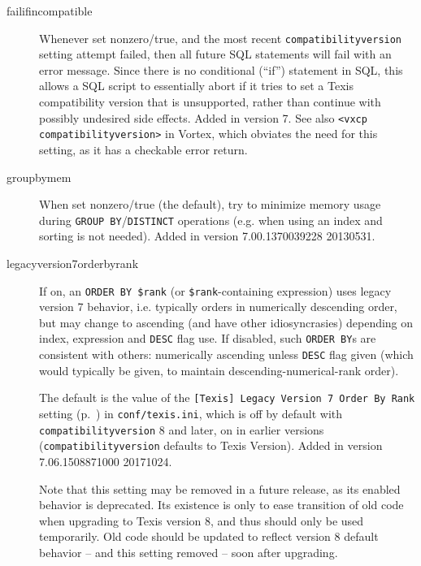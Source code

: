 \begin{description}
\item[failifincompatible]

  Whenever set nonzero/true, and the most recent
  \verb`compatibilityversion` setting attempt failed, then all future
  SQL statements will fail with an error message.  Since there is no
  conditional (``if'') statement in SQL, this allows a SQL script to
  essentially abort if it tries to set a Texis compatibility version
  that is unsupported, rather than continue with possibly undesired
  side effects.  Added in version 7.  See also
  \verb`<vxcp compatibilityversion>` in Vortex, which obviates the
  need for this setting, as it has a checkable error return.

\item[groupbymem]

  When set nonzero/true (the default), try to minimize memory usage
  during \verb`GROUP BY`/\verb`DISTINCT` operations (e.g. when using an
  index and sorting is not needed).  Added in version 7.00.1370039228
  20130531.

\item[legacyversion7orderbyrank]
\label{SqlPropertyLegacyVersion7OrderByRank}

  If on, an {\tt ORDER BY \$rank} (or {\tt \$rank}-containing
  expression) uses legacy version 7 behavior, i.e. typically orders in
  numerically descending order, but may change to ascending (and have
  other idiosyncrasies) depending on index, expression and \verb`DESC`
  flag use.  If disabled, such {\tt ORDER BY}s are consistent with
  others: numerically ascending unless \verb`DESC` flag given (which
  would typically be given, to maintain descending-numerical-rank
  order).

  The default is the value of the {\tt [Texis] Legacy Version 7 Order
    By Rank} setting (p.~\pageref{TexisIniLegacyVersion7OrderByRank})
  in {\tt conf/texis.ini}, which is off by default with
  \verb`compatibilityversion` 8 and later, on in earlier
  versions (\verb`compatibilityversion` defaults to Texis Version).
  Added in version 7.06.1508871000 20171024.

  Note that this setting may be removed in a future release, as its
  enabled behavior is deprecated.  Its existence is only to ease
  transition of old code when upgrading to Texis version 8, and thus
  should only be used temporarily.  Old code should be updated to
  reflect version 8 default behavior -- and this setting removed --
  soon after upgrading.
  
\end{description}

